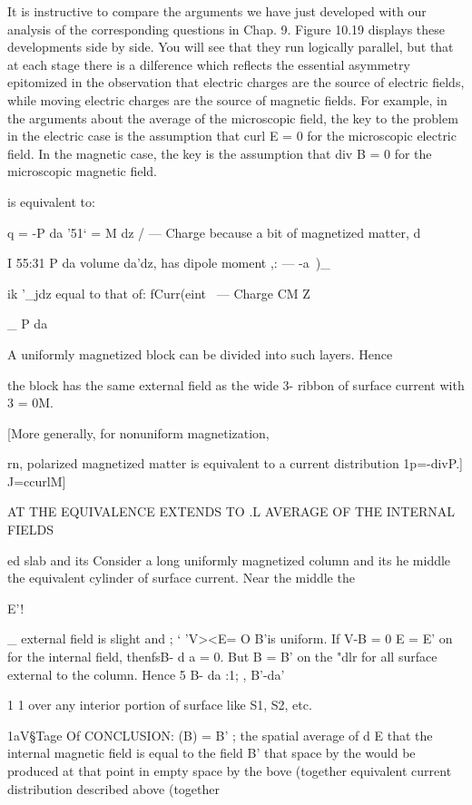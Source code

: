 {{It is instructive to compare the arguments we have just developed
with our analysis of the corresponding questions in Chap. 9. Figure
10.19 displays these developments side by side. You will see that
they run logically parallel, but that at each stage there is a dilference
which reflects the essential asymmetry epitomized in the observation
that electric charges are the source of electric fields, while moving
electric charges are the source of magnetic fields. For example, in
the arguments about the average of the microscopic field, the key
to the problem in the electric case is the assumption that curl E = 0
for the microscopic electric field. In the magnetic case, the key is
the assumption that div B = 0 for the microscopic magnetic field.

is equivalent to:

     

q = -P da '51‘ = M dz
/ ---  Charge because a bit of magnetized matter, d

I 55:31 P da volume da'dz, has dipole moment ,: --- -a~)_

ik '_jdz equal to that of: fCurr(eint
\ --- Charge CM Z

_ P da 

A uniformly magnetized block can
be divided into such layers. Hence

the block has the
same external  
field as the wide  3-
ribbon of surface 
current with 3 = 0M.

[More generally, for nonuniform magnetization,

rn, polarized magnetized matter is equivalent to a current distribution
1p=-divP.] J=ccurlM]

      

{AT THE EQUIVALENCE EXTENDS TO
.L AVERAGE OF THE INTERNAL FIELDS

ed slab and its Consider a long uniformly magnetized column and its
he middle the equivalent cylinder of surface
current. Near the middle the

   
  

   

E'!

_ external field is slight and ;  ‘
'V><E= O B'is uniform. If V-B = 0 
E = E' on for the internal field, thenfsB- d a = 0. But B = B' on the
"dlr for all surface external to the column. Hence 5 B- da :1; , B'-da'

1 1
over any interior portion of surface like S1, S2, etc.

1aV§Tage Of CONCLUSION: (B) = B' ; the spatial average of
d E that the internal magnetic field is equal to the field B' that
space by the would be produced at that point in empty space by the
bove (together equivalent current distribution described above (together

}}}
